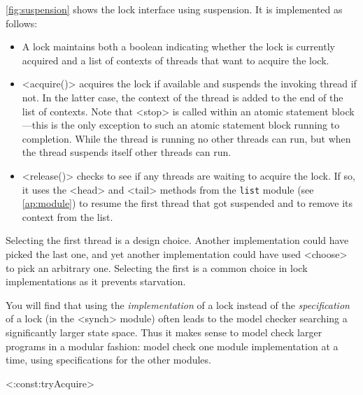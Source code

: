 \documentclass{report}
\begin{document}
\autoref{fig:suspension} shows the lock interface using suspension.
It is implemented as follows:
\begin{itemize}
\item A lock maintains both a boolean indicating whether the
lock is currently acquired and a list of contexts of threads that want to
acquire the lock.
\item
<{acquire()}>
%
acquires the lock if available and suspends the invoking thread if not.
In the latter case, the context of the thread is added to the end of the list of contexts.
Note that <{stop}> is called within an atomic statement block---this is
the only exception to such an atomic statement block running to completion.
While the
thread is running no other threads can run, but when the thread suspends itself
other threads can run.
\item
<{release()}>
%
checks to see if any threads are waiting to acquire the lock.
If so, it uses the <{head}> and <{tail}>
methods from the \texttt{list} module (see \autoref{ap:module})
to resume the first thread that got
suspended and to remove its context from the list.
\end{itemize}
Selecting the first thread is a design choice.  Another implementation could
have picked the last one, and yet another implementation could have used
<{choose}> to pick an arbitrary one.  Selecting the first is a common
choice in lock implementations as it prevents starvation.

You will find that using the \emph{implementation} of a lock instead
of the \emph{specification} of a lock (in the <{synch}> module)
often leads to the model checker searching a
significantly larger state space.
Thus it makes sense to model check larger programs in a modular fashion:
model check one module implementation at a time, using
specifications for the other modules.

<{:const:tryAcquire}>
\end{document}
